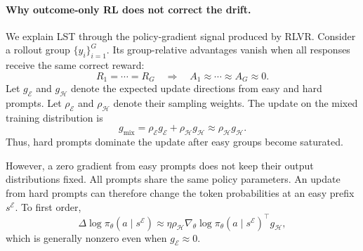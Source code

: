 \documentclass{article} %
\begin{document}
\paragraph{Why outcome-only RL does not correct the drift.}
We explain LST through the policy-gradient signal produced by RLVR. Consider a
rollout group $\{y_i\}_{i=1}^{G}$. Its group-relative advantages vanish when
all responses receive the same correct reward:
\begin{equation}
  R_1=\cdots=R_G
  \quad\Longrightarrow\quad
  A_1\approx\cdots\approx A_G\approx0.
  \label{eq:saturation}
\end{equation}
Let $g_{\mathcal E}$ and $g_{\mathcal H}$ denote the expected update directions
from easy and hard prompts. Let $\rho_{\mathcal E}$ and $\rho_{\mathcal H}$
denote their sampling weights. The update on the mixed training distribution is
\begin{equation}
  g_{\mathrm{mix}}
  =
  \rho_{\mathcal E}g_{\mathcal E}
  +
  \rho_{\mathcal H}g_{\mathcal H}
  \approx
  \rho_{\mathcal H}g_{\mathcal H}.
  \label{eq:gradient-dominance}
\end{equation}
Thus, hard prompts dominate the update after easy groups become saturated.

However, a zero gradient from easy prompts does not keep their output
distributions fixed. All prompts share the same policy parameters. An update
from hard prompts can therefore change the token probabilities at an easy
prefix $s^{\mathcal E}$. To first order,
\begin{equation}
  \Delta\log\pi_\theta(a\mid s^{\mathcal E})
  \approx
  \eta\rho_{\mathcal H}
  \nabla_\theta\log\pi_\theta(a\mid s^{\mathcal E})^\top
  g_{\mathcal H},
  \label{eq:cross-prompt-drift}
\end{equation}
which is generally nonzero even when $g_{\mathcal E}\approx0$.

\end{document}
